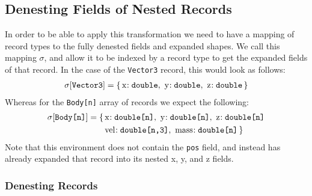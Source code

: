 
\subsection{Denesting Fields of Nested Records}

In order to be able to apply this transformation we need to have a mapping of record types to the fully denested fields and expanded shapes.
We call this mapping $\sigma$, and allow it to be indexed by a record type to get the expanded fields of that record.
In the case of the \texttt{Vector3} record, this would look as follows:
%
\begin{align*}
    \sigma[\texttt{Vector3}] = \makeenv{
        \envid{x} \texttt{double},\ 
        \envid{y} \texttt{double},\ 
        \envid{z} \texttt{double}
    }
\end{align*}
%
Whereas for the \texttt{Body[n]} array of records we expect the following:
%
\begin{align*}
    \sigma[\texttt{Body[n]}] = \makeenv{
        &\envid{x} \texttt{double[n]},\ 
        \envid{y} \texttt{double[n]},\ 
        \envid{z} \texttt{double[n]} \\
        &\envid{vel} \texttt{double[n,3]},\ 
        \envid{mass} \texttt{double[n]}
    }
\end{align*}
%
Note that this environment does not contain the \texttt{pos} field, and instead has already expanded that record into its nested x, y, and z fields.


\subsubsection{Denesting Records}

